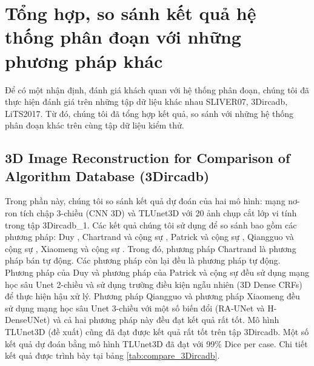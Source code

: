 \chapter{Tổng hợp, so sánh kết quả hệ thống phân đoạn với những phương pháp khác}
Để có một nhận định, đánh giá khách quan với hệ thống phân đoạn, chúng tôi đã thực hiện đánh giá trên những tập dữ liệu khác nhau SLIVER07, 3Dircadb,  LiTS2017. Từ đó, chúng tôi đã tổng hợp kết quả, so sánh với những hệ thống phân đoạn khác trên cùng tập dữ liệu kiểm thử.
\section{3D Image Reconstruction for Comparison of Algorithm Database (3Dircadb)}
Trong phần này, chúng tôi so sánh kết quả dự đoán của hai mô hình: mạng nơ-ron tích chập 3-chiều (CNN 3D) và TLUnet3D với 20 ảnh chụp cắt lớp vi tính trong tập 3Dircadb\_1. Các kết quả chúng tôi sử dụng để so sánh bao gồm các phương pháp: Duy \cite{Duy_paper}, Chartrand và cộng sự \cite{Chartrand_paper}, Patrick và cộng sự \cite{Patrick_paper}, Qiangguo và cộng sự  \cite{Qiangguo_paper}, Xiaomeng và cộng sự  \cite{Xiaomeng_paper}. Trong đó, phương pháp Chartrand \cite{Chartrand_paper} là phương pháp bán tự động. Các phương pháp còn lại đều là phương pháp tự động. Phương pháp của Duy \cite{Duy_paper} và phương pháp của Patrick và cộng sự\cite{Patrick_paper} đều sử dụng mạng học sâu Unet 2-chiều và sử dụng trường điều kiện ngẫu nhiên (3D Dense CRFs) để thực hiện hậu xử lý. Phương pháp Qiangguo\cite{Qiangguo_paper} và phương pháp Xiaomeng \cite{Xiaomeng_paper} đều sử dụng mạng học sâu Unet 3-chiều với một số biến đổi (RA-UNet và H-DenseUNet) và cả hai phương pháp này đều đạt kết quả rất tốt. Mô hình TLUnet3D (đề xuất) cũng đã đạt được kết quả rất tốt trên tập 3Dircadb. Một số kết quả dự đoán bằng mô hình TLUnet3D đã đạt với 99\%  Dice per case. Chi tiết kết quả được trình bày tại bảng \ref{tab:compare_3Dircadb}.

